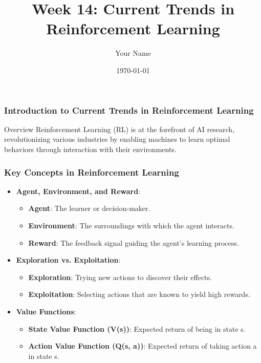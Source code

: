 \documentclass{beamer}
\title{Week 14: Current Trends in Reinforcement Learning}
\author{Your Name}
\institute{Your Institution}
\date{\today}
\begin{document}
\frame{\titlepage}

\begin{frame}[fragile]
    \frametitle{Introduction to Current Trends in Reinforcement Learning}
    \begin{block}{Overview}
        Reinforcement Learning (RL) is at the forefront of AI research, revolutionizing various industries by enabling machines to learn optimal behaviors through interaction with their environments.
    \end{block}
\end{frame}

\begin{frame}[fragile]
    \frametitle{Key Concepts in Reinforcement Learning}
    \begin{itemize}
        \item \textbf{Agent, Environment, and Reward}:
        \begin{itemize}
            \item \textbf{Agent}: The learner or decision-maker.
            \item \textbf{Environment}: The surroundings with which the agent interacts.
            \item \textbf{Reward}: The feedback signal guiding the agent's learning process.
        \end{itemize}
        
        \item \textbf{Exploration vs. Exploitation}:
        \begin{itemize}
            \item \textbf{Exploration}: Trying new actions to discover their effects.
            \item \textbf{Exploitation}: Selecting actions that are known to yield high rewards.
        \end{itemize}
        
        \item \textbf{Value Functions}:
        \begin{itemize}
            \item \textbf{State Value Function (V(s))}: Expected return of being in state s.
            \item \textbf{Action Value Function (Q(s, a))}: Expected return of taking action a in state s.
        \end{itemize}
    \end{itemize}
\end{frame}
\end{document}
